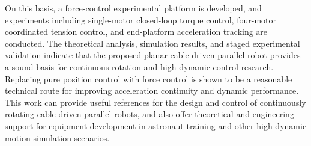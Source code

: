 \begin{eabstract}
On this basis, a force-control experimental platform is developed, and experiments including single-motor closed-loop torque control, four-motor coordinated tension control, and end-platform acceleration tracking are conducted. The theoretical analysis, simulation results, and staged experimental validation indicate that the proposed planar cable-driven parallel robot provides a sound basis for continuous-rotation and high-dynamic control research. Replacing pure position control with force control is shown to be a reasonable technical route for improving acceleration continuity and dynamic performance. This work can provide useful references for the design and control of continuously rotating cable-driven parallel robots, and also offer theoretical and engineering support for equipment development in astronaut training and other high-dynamic motion-simulation scenarios.

\end{eabstract}




